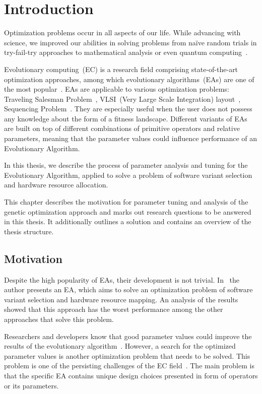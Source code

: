 \chapter{Introduction}\label{intro}

Optimization problems occur in all aspects of our life.  While advancing with science, we improved our abilities in solving problems from naïve random trials in try-fail-try approaches to mathematical analysis or even quantum computing~\cite{hogg2000quantum}.

Evolutionary computing~(EC) is a research field comprising state-of-the-art optimization approaches, among which evolutionary algorithms~(EAs) are one of the most popular~\cite{vikhar16}. EAs are applicable to various optimization problems: Traveling Salesman Problem~\cite{carter2006new}, VLSI~(Very Large Scale Integration) layout~\cite{shahookar1990genetic}, Sequencing Problem~\cite{gockel1997influencing}. They are especially useful when the user does not possess any knowledge about the form of a fitness landscape. Different variants of EAs are built on top of different combinations of primitive operators and relative parameters, meaning that the parameter values could influence performance of an Evolutionary Algorithm. 

In this thesis, we describe the process of parameter analysis and tuning for the Evolutionary Algorithm, applied to solve a problem of software variant selection and hardware resource allocation.


This chapter describes the motivation for parameter tuning and analysis of the genetic optimization approach and marks out research questions to be answered in this thesis. It additionally outlines a solution and contains an overview of the thesis structure.

\section{Motivation}

Despite the high popularity of EAs, their development is not trivial.
In~\cite{ahmad18} the author presents an EA, which aims to solve an optimization problem of software variant selection and hardware resource mapping. An analysis of the results showed that this approach has the worst performance among the other approaches that solve this problem.


Researchers and developers know that good parameter values could improve the results of the evolutionary algorithm~\cite{eiben03}. However, a search for the optimized parameter values is another optimization problem that needs to be solved. This problem is one of the persisting challenges of the EC field~\cite{smit2010parameter}. The main problem is that the specific EA contains unique design choices presented in form of operators or its parameters.  

